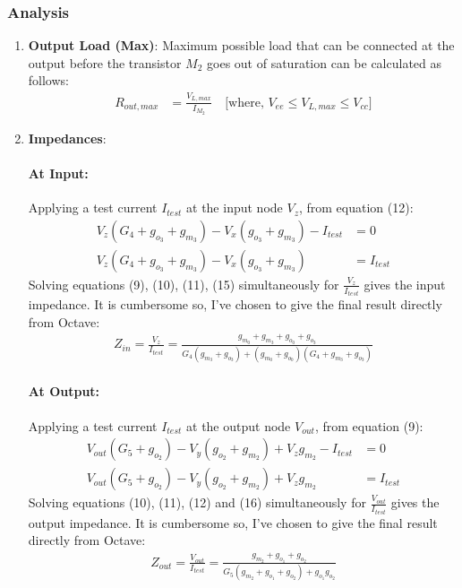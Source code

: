 \subsubsection{Analysis}
\begin{enumerate}
  \item \textbf{Output Load (Max)}: Maximum possible
    load that can be connected at the output before
    the transistor $M_2$ goes out of saturation can
    be calculated as follows:
    \begin{align*}
      R_{out, max} &= \frac{V_{L, max}}{I_{M_2}} \quad \text{[where, } V_{ee} \leq V_{L, max} \leq V_{cc} \text{]}
    \end{align*}
  \item \textbf{Impedances}:
    \paragraph{At Input:}Applying a test current $I_{test}$
      at the input node $V_{z}$, from equation (12):
      \begin{align*}
        V_{z}(G_4 + g_{o_3} + g_{m_3}) - V_{x}(g_{o_3} + g_{m_3}) - I_{test} &= 0 \\
        V_{z}(G_4 + g_{o_3} + g_{m_3}) - V_{x}(g_{o_3} + g_{m_3}) &= I_{test} \tag{15}
      \end{align*}
      Solving equations (9), (10), (11), (15) simultaneously for $\frac{V_{z}}{I_{test}}$
      gives the input impedance. It is cumbersome so, I've chosen to give the final
      result directly from Octave:
      \begin{align*}
        Z_{in} = \frac{V_{z}}{I_{test}} = \frac{g_{m_0} + g_{m_3} + g_{o_0} + g_{o_3}}{G_{4}(g_{m_3} + g_{o_3}) + (g_{m_0} + g_{o_0})(G_{4} + g_{m_3} + g_{o_3})}
      \end{align*}
    \paragraph{At Output:}Applying a test current $I_{test}$
      at the output node $V_{out}$, from equation (9):
      \begin{align*}
        V_{out}(G_5 + g_{o_2}) - V_{y}(g_{o_2} + g_{m_2}) + V_{z}g_{m_2} - I_{test} &= 0 \\
        V_{out}(G_5 + g_{o_2}) - V_{y}(g_{o_2} + g_{m_2}) + V_{z}g_{m_2} &= I_{test} \tag{16}
      \end{align*}
      Solving equations (10), (11), (12) and (16) simultaneously for $\frac{V_{out}}{I_{test}}$
      gives the output impedance. It is cumbersome so, I've chosen to give the final
      result directly from Octave:
      \begin{align*}
        Z_{out} = \frac{V_{out}}{I_{test}} = \frac{g_{m_2} + g_{o_1} + g_{o_2}}{G_{5}(g_{m_2} + g_{o_1} + g_{o_2}) + g_{o_1} g_{o_2}}
      \end{align*}
\end{enumerate}


